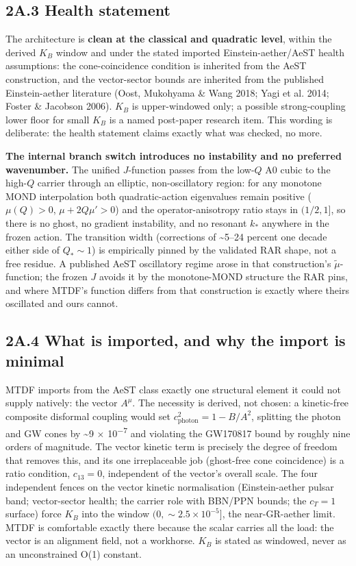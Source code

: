 \documentclass[11pt,a4paper]{article}
\begin{document}
\subsection*{2A.3 Health statement}
The architecture is \textbf{clean at the classical and quadratic level}, within the derived \(K_B\) window and under the stated imported Einstein-aether/\allowbreak{}AeST health assumptions: the cone-coincidence condition is inherited from the AeST construction, and the vector-sector bounds are inherited from the published Einstein-aether literature (Oost, Mukohyama \& Wang 2018; Yagi et al. 2014; Foster \& Jacobson 2006). \(K_B\) is upper-windowed only; a possible strong-coupling lower floor for small \(K_B\) is a named post-paper research item. This wording is deliberate: the health statement claims exactly what was checked, no more.

\textbf{The internal branch switch introduces no instability and no preferred wavenumber.} The unified \(J\)-function passes from the low-\(Q\) A0 cubic to the high-\(Q\) carrier through an elliptic, non-oscillatory region: for any monotone MOND interpolation both quadratic-action eigenvalues remain positive (\(\mu(Q) > 0\), \(\mu + 2Q\mu' > 0\)) and the operator-anisotropy ratio stays in \((1/2, 1]\), so there is no ghost, no gradient instability, and no resonant \(k_*\) anywhere in the frozen action. The transition width (corrections of \~{}5--24 percent one decade either side of \(Q_* \sim 1\)) is empirically pinned by the validated RAR shape, not a free residue. A published AeST oscillatory regime arose in that construction's \(\tilde{\mu}\)-function; the frozen \(J\) avoids it by the monotone-MOND structure the RAR pins, and where MTDF's function differs from that construction is exactly where theirs oscillated and ours cannot.

\subsection*{2A.4 What is imported, and why the import is minimal}
MTDF imports from the AeST class exactly one structural element it could not supply natively: the vector \(A^\mu\). The necessity is derived, not chosen: a kinetic-free composite disformal coupling would set \(c_{\mathrm{photon}}^2 = 1 - B/A^2\), splitting the photon and GW cones by \~{}9 $\times$ 10\textsuperscript{$-$7} and violating the GW170817 bound by roughly nine orders of magnitude. The vector kinetic term is precisely the degree of freedom that removes this, and its one irreplaceable job (ghost-free cone coincidence) is a ratio condition, \(c_{13} = 0\), independent of the vector's overall scale. The four independent fences on the vector kinetic normalisation (Einstein-aether pulsar band; vector-sector health; the carrier role with BBN/\allowbreak{}PPN bounds; the \(c_T = 1\) surface) force \(K_B\) into the window \((0, \sim 2.5\times10^{-5}]\), the near-GR-aether limit. MTDF is comfortable exactly there because the scalar carries all the load: the vector is an alignment field, not a workhorse. \(K_B\) is stated as windowed, never as an unconstrained O(1) constant.
\end{document}
